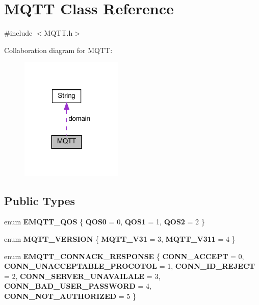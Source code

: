\section{M\+Q\+TT Class Reference}
\label{class_m_q_t_t}


{\ttfamily \#include $<$M\+Q\+T\+T.\+h$>$}



Collaboration diagram for M\+Q\+TT\+:\nopagebreak
\begin{figure}[H]
\begin{center}
\leavevmode
\includegraphics[width=137pt]{class_m_q_t_t__coll__graph}
\end{center}
\end{figure}
\subsection*{Public Types}
\begin{DoxyCompactItemize}
\item 
enum \textbf{ E\+M\+Q\+T\+T\+\_\+\+Q\+OS} \{ \textbf{ Q\+O\+S0} = 0, 
\textbf{ Q\+O\+S1} = 1, 
\textbf{ Q\+O\+S2} = 2
 \}
\item 
enum \textbf{ M\+Q\+T\+T\+\_\+\+V\+E\+R\+S\+I\+ON} \{ \textbf{ M\+Q\+T\+T\+\_\+\+V31} = 3, 
\textbf{ M\+Q\+T\+T\+\_\+\+V311} = 4
 \}
\item 
enum \textbf{ E\+M\+Q\+T\+T\+\_\+\+C\+O\+N\+N\+A\+C\+K\+\_\+\+R\+E\+S\+P\+O\+N\+SE} \{ \newline
\textbf{ C\+O\+N\+N\+\_\+\+A\+C\+C\+E\+PT} = 0, 
\textbf{ C\+O\+N\+N\+\_\+\+U\+N\+A\+C\+C\+E\+P\+T\+A\+B\+L\+E\+\_\+\+P\+R\+O\+C\+O\+T\+OL} = 1, 
\textbf{ C\+O\+N\+N\+\_\+\+I\+D\+\_\+\+R\+E\+J\+E\+CT} = 2, 
\textbf{ C\+O\+N\+N\+\_\+\+S\+E\+R\+V\+E\+R\+\_\+\+U\+N\+A\+V\+A\+I\+L\+A\+LE} = 3, 
\newline
\textbf{ C\+O\+N\+N\+\_\+\+B\+A\+D\+\_\+\+U\+S\+E\+R\+\_\+\+P\+A\+S\+S\+W\+O\+RD} = 4, 
\textbf{ C\+O\+N\+N\+\_\+\+N\+O\+T\+\_\+\+A\+U\+T\+H\+O\+R\+I\+Z\+ED} = 5
 \}
\end{DoxyCompactItemize}
